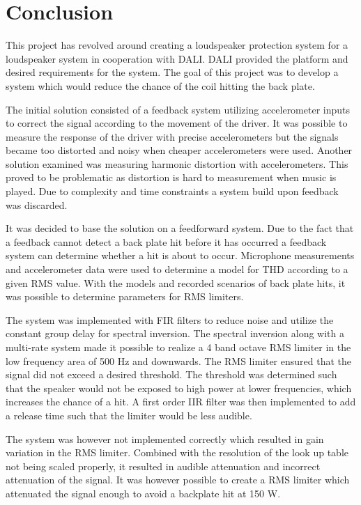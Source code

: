 \chapter{Conclusion}\label{cha:conclusion}
This project has revolved around creating a loudspeaker protection system for a loudspeaker system in cooperation with DALI. DALI provided the platform and desired requirements for the system. The goal of this project was to develop a system which would reduce the chance of the coil hitting the back plate.

The initial solution consisted of a feedback system utilizing accelerometer inputs to correct the signal according to the movement of the driver. It was possible to measure the response of the driver with precise accelerometers but the signals became too distorted and noisy when cheaper accelerometers were used. Another solution examined was measuring harmonic distortion with accelerometers. This proved to be problematic as distortion is hard to measurement when music is played. Due to complexity and time constraints a system build upon feedback was discarded.


It was decided to base the solution on a feedforward system. Due to the fact that a feedback cannot detect a back plate hit before it has occurred a feedback system can determine whether a hit is about to occur. Microphone measurements and accelerometer data were used to determine a model for THD according to a given RMS value. With the models and recorded scenarios of back plate hits, it was possible to determine parameters for RMS limiters.


The system was implemented with FIR filters to reduce noise and utilize the constant group delay for spectral inversion. The spectral inversion along with a multi-rate system made it possible to realize a 4 band octave RMS limiter in the low frequency area of 500 Hz and downwards. The RMS limiter ensured that the signal did not exceed a desired threshold. The threshold was determined such that the speaker would not be exposed to high power at lower frequencies, which increases the chance of a hit. A first order IIR filter was then implemented to add a release time such that the limiter would be less audible.
 
The system was however not implemented correctly which resulted in gain variation in the RMS limiter. Combined with the resolution of the look up table not being scaled properly, it resulted in audible attenuation and incorrect attenuation of the signal. It was however possible to create a RMS limiter which attenuated the signal enough to avoid a backplate hit at 150 W.